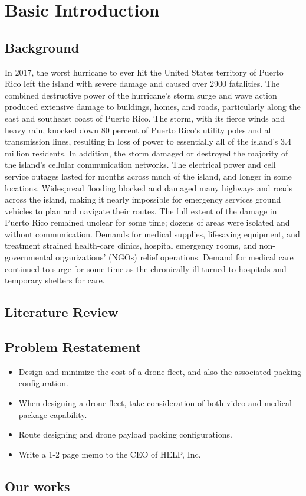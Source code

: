 \MinParskip{}

\section{Basic Introduction}

\subsection{Background}
In 2017, the worst hurricane to ever hit the United States territory of Puerto Rico left the island with severe damage and caused over 2900 fatalities. The combined destructive power of the hurricane's storm surge and wave action produced extensive damage to buildings, homes, and roads, particularly along the east and southeast coast of Puerto Rico. The storm, with its fierce winds and heavy rain, knocked down 80 percent of Puerto Rico's utility poles and all transmission lines, resulting in loss of power to essentially all of the island's 3.4 million residents. In addition, the storm damaged or destroyed the majority of the island's cellular communication networks. The electrical power and cell service outages lasted for months across much of the island, and longer in some locations. Widespread flooding blocked and damaged many highways and roads across the island, making it nearly impossible for emergency services ground vehicles to plan and navigate their routes. The full extent of the damage in Puerto Rico remained unclear for some time; dozens of areas were isolated and without communication. Demands for medical supplies, lifesaving equipment, and treatment strained health-care clinics, hospital emergency rooms, and non-governmental organizations' (NGOs) relief operations. Demand for medical care continued to surge for some time as the chronically ill turned to hospitals and temporary shelters for care.

\subsection{Literature Review}


\subsection{Problem Restatement}
\begin{itemize}
    \item Design and minimize the cost of a drone fleet, and also the associated packing configuration.
    \item When designing a drone fleet, take consideration of both video and medical package capability.
    \item Route designing and drone payload packing configurations.
    \item Write a 1-2 page memo to the CEO of HELP, Inc.
\end{itemize}

\subsection{Our works}
    \cite{LBMA}



